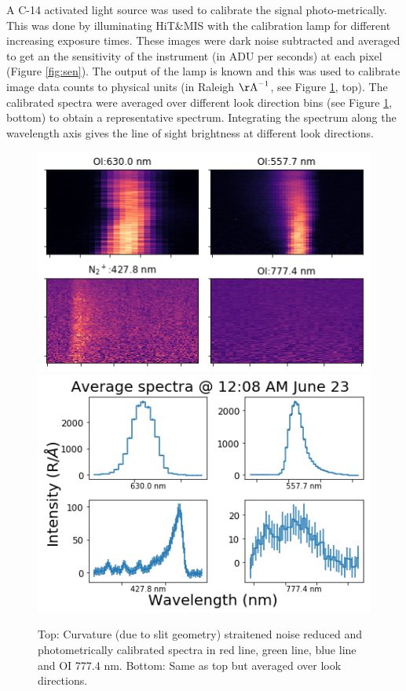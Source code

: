 \documentclass[crop=false,class=mitthesis,oneside,font=12pt]{standalone}
\begin{document}
A C-14 activated light source was used to calibrate the signal photo-metrically. This was done by illuminating HiT\&MIS with the calibration lamp for different increasing exposure times. These images were dark noise subtracted and averaged to get an the sensitivity of the instrument (in ADU per seconds) at each pixel (Figure \ref{fig:sen}). The output of the lamp is known and this was used to calibrate image data counts to physical units (in Raleigh $\rm {\AA}^{-1}$, see Figure \ref{fig:calib}, top). The calibrated spectra were averaged over different look direction bins (see Figure \ref{fig:calib}, bottom) to obtain a representative spectrum. Integrating the spectrum along the wavelength axis gives the line of sight brightness at different look directions. 
\begin{figure}[H]
	\centering\includegraphics[width=30pc]{feature_img.png}
    \centering\includegraphics[width=30pc]{feature_spectra.png}
	\caption{Top: Curvature (due to slit geometry) straitened noise reduced and photometrically calibrated spectra in red line, green line, blue line and OI 777.4 nm. Bottom: Same as top but averaged over look directions.}
	\label{fig:calib}
\end{figure}
\end{document}
